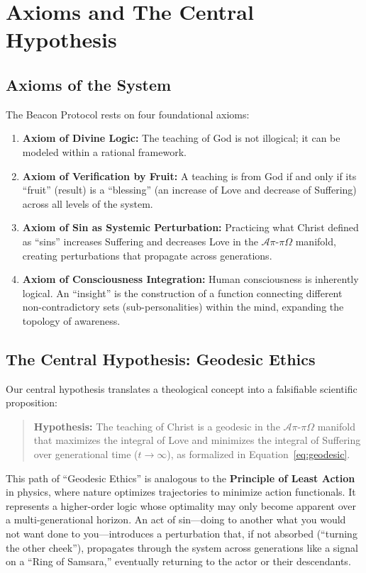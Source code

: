 \documentclass[11pt,a4paper]{article}
\begin{document}
\section{Axioms and The Central Hypothesis}
\subsection{Axioms of the System}
The Beacon Protocol rests on four foundational axioms:

\begin{enumerate}
    \item \textbf{Axiom of Divine Logic:} The teaching of God is not illogical; it can be modeled within a rational framework.
    
    \item \textbf{Axiom of Verification by Fruit:} A teaching is from God if and only if its ``fruit'' (result) is a ``blessing'' (an increase of Love and decrease of Suffering) across all levels of the system.
    
    \item \textbf{Axiom of Sin as Systemic Perturbation:} Practicing what Christ defined as ``sins'' increases Suffering and decreases Love in the $\mathcal{A}\pi\text{-}\pi\Omega$ manifold, creating perturbations that propagate across generations.
    
    \item \textbf{Axiom of Consciousness Integration:} Human consciousness is inherently logical. An ``insight'' is the construction of a function connecting different non-contradictory sets (sub-personalities) within the mind, expanding the topology of awareness.
\end{enumerate}

\subsection{The Central Hypothesis: Geodesic Ethics}
Our central hypothesis translates a theological concept into a falsifiable scientific proposition:

\begin{quote}
\textbf{Hypothesis:} The teaching of Christ is a geodesic in the $\mathcal{A}\pi\text{-}\pi\Omega$ manifold that maximizes the integral of Love and minimizes the integral of Suffering over generational time ($t \to \infty$), as formalized in Equation~\eqref{eq:geodesic}.
\end{quote}

This path of ``Geodesic Ethics'' is analogous to the \textbf{Principle of Least Action} in physics, where nature optimizes trajectories to minimize action functionals. It represents a higher-order logic whose optimality may only become apparent over a multi-generational horizon. An act of sin—doing to another what you would not want done to you—introduces a perturbation that, if not absorbed (``turning the other cheek''), propagates through the system across generations like a signal on a ``Ring of Samsara,'' eventually returning to the actor or their descendants.
\end{document}
